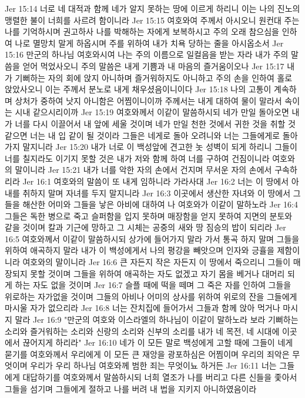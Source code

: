 Jer 15:14  너로 네 대적과 함께 네가 알지 못하는 땅에 이르게 하리니 이는 나의 진노의 맹렬한 불이 너희를 사르려 함이니라
Jer 15:15  여호와여 주께서 아시오니 원컨대 주는 나를 기억하시며 권고하사 나를 박해하는 자에게 보복하시고 주의 오래 참으심을 인하여 나로 멸망치 말게 하옵시며 주를 위하여 내가 치욕 당하는 줄을 아시옵소서
Jer 15:16  만군의 하나님 여호와시여 나는 주의 이름으로 일컬음을 받는 자라 내가 주의 말씀을 얻어 먹었사오니 주의 말씀은 내게 기쁨과 내 마음의 즐거움이오나
Jer 15:17  내가 기뻐하는 자의 회에 앉지 아니하며 즐거워하지도 아니하고 주의 손을 인하여 홀로 앉았사오니 이는 주께서 분노로 내게 채우셨음이니이다
Jer 15:18  나의 고통이 계속하며 상처가 중하여 낫지 아니함은 어찜이니이까 주께서는 내게 대하여 물이 말라서 속이는 시내 같으시리이까
Jer 15:19  여호와께서 이같이 말씀하시되 네가 만일 돌아오면 내가 너를 다시 이끌어서 내 앞에 세울 것이며 네가 만일 천한 것에서 귀한 것을 취할 것 같으면 너는 내 입 같이 될 것이라 그들은 네게로 돌아 오려니와 너는 그들에게로 돌아가지 말지니라
Jer 15:20  내가 너로 이 백성앞에 견고한 놋 성벽이 되게 하리니 그들이 너를 칠지라도 이기지 못할 것은 내가 저와 함께 하여 너를 구하여 건짐이니라 여호와의 말이니라
Jer 15:21  내가 너를 악한 자의 손에서 건지며 무서운 자의 손에서 구속하리라
Jer 16:1  여호와의 말씀이 또 내게 임하니라 가라사대
Jer 16:2  너는 이 땅에서 아내를 취하지 말며 자녀를 두지 말지니라
Jer 16:3  이곳에서 생산한 자녀와 이 땅에서 그들을 해산한 어미와 그들을 낳은 아비에 대하여 나 여호와가 이같이 말하노라
Jer 16:4  그들은 독한 병으로 죽고 슬퍼함을 입지 못하며 매장함을 얻지 못하여 지면의 분토와 같을 것이며 칼과 기근에 망하고 그 시체는 공중의 새와 땅 짐승의 밥이 되리라
Jer 16:5  여호와께서 이같이 말씀하시되 상가에 들어가지 말라 가서 통곡 하지 말며 그들을 위하여 애곡하지 말라 내가 이 백성에게서 나의 평강을 빼앗으며 인자와 긍휼을 제함이니라 여호와의 말이니라
Jer 16:6  큰 자든지 작은 자든지 이 땅에서 죽으리니 그들이 매장되지 못할 것이며 그들을 위하여 애곡하는 자도 없겠고 자기 몸을 베거나 대머리 되게 하는 자도 없을 것이며
Jer 16:7  슬플 때에 떡을 떼며 그 죽은 자를 인하여 그들을 위로하는 자가없을 것이며 그들의 아비나 어미의 상사를 위하여 위로의 잔을 그들에게 마시울 자가 없으리라
Jer 16:8  너는 잔치집에 들어가서 그들과 함께 앉아 먹거나 마시지 말라
Jer 16:9  "만군의 여호와 이스라엘의 하나님이 이같이 말하노라 보라 기뻐하는 소리와 즐거워하는 소리와 신랑의 소리와 신부의 소리를 내가 네 목전, 네 시대에 이곳에서 끊어지게 하리라"
Jer 16:10  네가 이 모든 말로 백성에게 고할 때에 그들이 네게 묻기를 여호와께서 우리에게 이 모든 큰 재앙을 광포하심은 어찜이며 우리의 죄악은 무엇이며 우리가 우리 하나님 여호와께 범한 죄는 무엇이뇨 하거든
Jer 16:11  너는 그들에게 대답하기를 여호와께서 말씀하시되 너희 열조가 나를 버리고 다른 신들을 좇아서 그들을 섬기며 그들에게 절하고 나를 버려 내 법을 지키지 아니하였음이라
